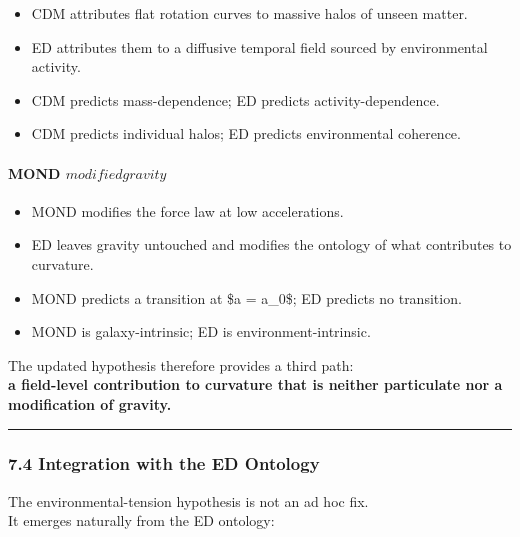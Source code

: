 \begin{itemize}
\tightlist
\item
  CDM attributes flat rotation curves to massive halos of unseen
  matter.\\
\item
  ED attributes them to a diffusive temporal field sourced by
  environmental activity.\\
\item
  CDM predicts mass-dependence; ED predicts activity-dependence.\\
\item
  CDM predicts individual halos; ED predicts environmental coherence.
\end{itemize}

\paragraph{\texorpdfstring{\textbf{MOND
\(modified gravity\)}}{MOND modified gravity}}\label{mond-modified-gravity}

\begin{itemize}
\tightlist
\item
  MOND modifies the force law at low accelerations.\\
\item
  ED leaves gravity untouched and modifies the ontology of what
  contributes to curvature.\\
\item
  MOND predicts a transition at \$a = a\_0\$; ED predicts no
  transition.\\
\item
  MOND is galaxy-intrinsic; ED is environment-intrinsic.
\end{itemize}

The updated hypothesis therefore provides a third path:\\
\textbf{a field-level contribution to curvature that is neither
particulate nor a modification of gravity.}

\begin{center}\rule{0.5\linewidth}{0.5pt}\end{center}

\subsubsection{7.4 Integration with the ED
Ontology}\label{integration-with-the-ed-ontology}

The environmental-tension hypothesis is not an ad hoc fix.\\
It emerges naturally from the ED ontology:

